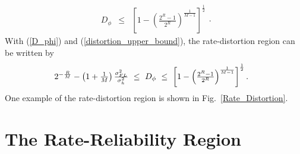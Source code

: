 \documentclass[10pt,fleqn, twocolumn]{IEEEtran}
\begin{document}
\begin{equation}
\begin{array}{rcl}
D_{\phi}&\leq&\left[1-\left(\frac{2^{R}-1}{2^R}\right)^{\frac{1}{M-1}}\right]^{\frac{1}{2}}
\end{array}.\label{distortion_upper_bound}
\end{equation}
\noindent With (\ref{D_phi}) and (\ref{distortion_upper_bound}),
the rate-distortion region can be written by
\begin{equation}\hspace{-0.10in}
\begin{array}{l}
2^{-\frac{R}{M}}-\left(1+\frac{1}{M}\right)\frac{\sigma_{\mbox{\tiny
FL}}^{2}}{\sigma_{h}^{2}}\ \leq\ D_{\phi}\ \leq\
\left[1-\left(\frac{2^{R}-1}{2^R}\right)^{\frac{1}{M-1}}\right]^{\frac{1}{2}}.
\end{array}
\end{equation}
\noindent One example of the rate-distortion region is shown in
Fig.~\ref{Rate_Distortion}.
\begin{figure}
\end{figure}


\section{The Rate-Reliability Region}
\end{document}
